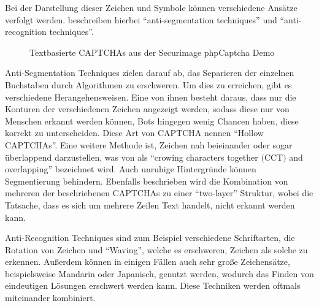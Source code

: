 Bei der Darstellung dieser Zeichen und Symbole können verschiedene Ansätze verfolgt werden.
\citeauthor{surveyofresearch} beschreiben hierbei ``anti-segmentation techniques'' und ``anti-recognition techniques''. \cite[p.76]{surveyofresearch}

\begin{figure}[h!]
    \centering
    \qquad
    \caption{Textbasierte CAPTCHAs aus der Securimage phpCaptcha Demo}   
    \label{fig:textbased}
\end{figure}

Anti-Segmentation Techniques zielen darauf ab, das Separieren der einzelnen Buchstaben durch Algorithmen zu erschweren. 
Um dies zu erreichen, gibt es verschiedene Herangehensweisen.
Eine von ihnen besteht daraus, dass nur die Konturen der verschiedenen Zeichen angezeigt werden, sodass diese nur von Menschen erkannt werden können,
Bots hingegen wenig Chancen haben, diese korrekt zu unterscheiden. Diese Art von CAPTCHA nennen \citeauthor{surveyofresearch} ``Hollow CAPTCHAs''. %
Eine weitere Methode ist, Zeichen nah beieinander oder sogar überlappend darzustellen, 
was von \citeauthor{surveyofresearch} als ``crowing characters together $($CCT$)$ and overlapping'' bezeichnet wird.
Auch unruhige Hintergründe können Segmentierung behindern.
Ebenfalls beschrieben wird die Kombination von mehreren der beschriebenen CAPTCHAs zu einer ``two-layer'' Struktur,
wobei die Tatsache, dass es sich um mehrere Zeilen Text handelt, nicht erkannt werden kann. \cite[p.76]{surveyofresearch} \cite[p.132f]{Beheshti}

Anti-Recognition Techniques sind zum Beispiel verschiedene Schriftarten, die Rotation von Zeichen und ``Waving'', 
welche es erschweren, Zeichen als solche zu erkennen. 
Außerdem können in einigen Fällen auch sehr große Zeichensätze, beispielsweise Mandarin oder Japanisch, genutzt werden, 
wodurch das Finden von eindeutigen Lösungen erschwert werden kann.
Diese Techniken werden oftmals miteinander kombiniert.
\cite[p.77]{surveyofresearch}

